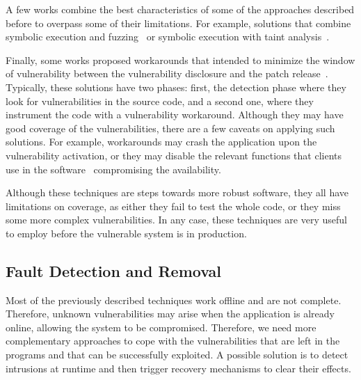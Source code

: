 A few works combine the best characteristics of some of the approaches described before to overpass some of their limitations.
For example, solutions that combine symbolic execution and fuzzing~\cite{Godefroid:2008,Stephens:2016,Kim:2017b} or symbolic execution with taint analysis~\cite{Haller:2013}.




Finally, some works proposed workarounds that intended to minimize the window of vulnerability between the vulnerability disclosure and the patch release~\cite{Goues:2012,Huang:2016}.
Typically, these solutions have two phases: first, the detection phase where they look for vulnerabilities in the source code, and a second one, where they instrument the code with a vulnerability workaround.
Although they may have good coverage of the vulnerabilities, there are a few caveats on applying such solutions.
For example, workarounds may crash the application upon the vulnerability activation, or they may disable the relevant functions that clients use in the software~\cite{Huang:2016} compromising the availability. 


Although these techniques are steps towards more robust software, they all have limitations on coverage, as either they fail to test the whole code, or they miss some more complex vulnerabilities.
In any case, these techniques are very useful to employ before the vulnerable system is in production.


\subsection{Fault Detection and Removal}
Most of the previously described techniques work offline and are not complete. 
Therefore, unknown vulnerabilities may arise when the application is already online, allowing the system to be compromised.
Therefore, we need more complementary approaches to cope with the vulnerabilities that are left in the programs and that can be successfully exploited.
A possible solution is to detect intrusions at runtime and then trigger recovery mechanisms to clear their effects. 


